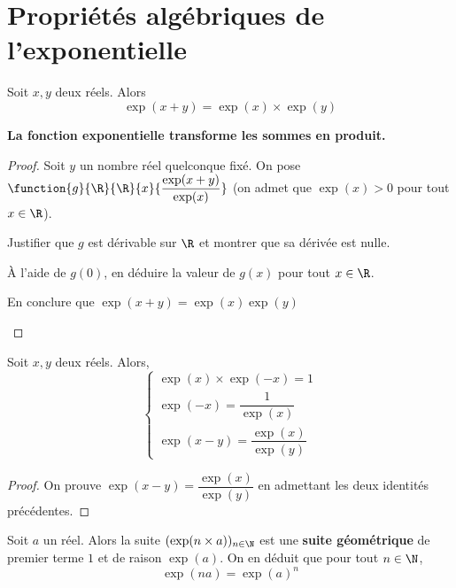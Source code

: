 \documentclass{article}
\begin{document}
\section{Propriétés algébriques de l'exponentielle}
\begin{tcolorbox}
\begin{theorem}
Soit $x,y$ deux réels. Alors
\begin{equation*}
\exp(x + y) = \exp(x) \times \exp(y)
\end{equation*}
\end{theorem}
\end{tcolorbox}
\begin{remark}
\textbf{La fonction exponentielle transforme les sommes en produit.}
\end{remark}
\begin{proof}
Soit $y$ un nombre réel quelconque fixé. On pose $\function{g}{\R}{\R}{x}{\dfrac{\exp(x + y)}{\exp(x)}}$ (on admet que $\exp(x) > 0$ pour tout $x \in \R$).
\begin{enumquestions}
\item Justifier que $g$ est dérivable sur $\R$ et montrer que sa dérivée est nulle.
\item À l'aide de $g(0)$, en déduire la valeur de $g(x)$ pour tout $x \in \R$.
\item En conclure que $\exp(x + y) = \exp(x)\exp(y)$
\end{enumquestions}

\vspace*{0.5cm}
\emptybox{7cm}
\end{proof}
\begin{corollary}
Soit $x,y$ deux réels. Alors,
\begin{equation*}
\begin{cases}
\exp(x) \times \exp(-x) = 1\\
\exp(- x) = \dfrac{1}{\exp(x)}\\
\exp(x - y) = \dfrac{\exp(x)}{\exp(y)}
\end{cases}
\end{equation*}
\end{corollary}
\begin{proof}
On prouve $\exp(x - y) = \dfrac{\exp(x)}{\exp(y)}$ en admettant les deux identités précédentes.

\vspace*{0.5cm}
\emptybox{5cm}
\end{proof}
\newpage
\begin{tcolorbox}
\begin{definition}
Soit $a$ un réel. Alors la suite $(\exp(n \times a))_{n \in \N}$ est une \textbf{suite géométrique} de premier terme $1$ et de raison $\exp(a)$. On en déduit que pour tout $n \in \N$,
\begin{equation*}
\exp(na) = \exp(a)^n
\end{equation*}
\end{definition}
\end{tcolorbox}
\end{document}
